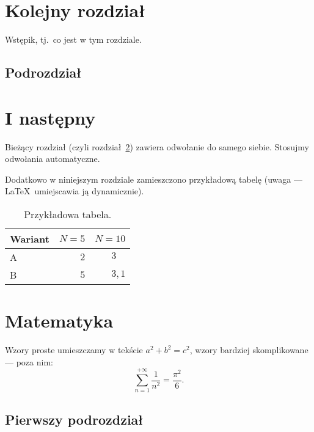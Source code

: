\documentclass[12pt,a4paper,twoside,openany]{book}
\begin{document}
\chapter{Kolejny rozdział}

Wstępik, tj.~co jest w tym rozdziale.

\section{Podrozdział}



\chapter{I następny}
\label{sec:nast}

Bieżący rozdział (czyli rozdział~\ref{sec:nast}) zawiera odwołanie do samego siebie. Stosujmy odwołania automatyczne.

Dodatkowo w niniejszym rozdziale zamieszczono przykładową tabelę (uwaga --- \LaTeX\ umiejscawia ją dynamicznie).



\begin{table}[h]
\centering
\caption{Przykładowa tabela.}
\label{tab:przyklad}
\footnotesize
\begin{tabular}{|l|r|r|}
\hline
Wariant & $N=5$ & $N=10$\\
\hline
A & $2$ & $3\phantom{{,}1}$ \\
B & $5$ & $3{,}1$ \\

\hline
\end{tabular} 
\end{table}

\clearpage

\chapter{Matematyka}

Wzory proste umieszczamy w tekście $a^2+b^2=c^2$, wzory bardziej skomplikowane --- poza nim:
\begin{equation}
\sum_{n=1}^{+\infty}\frac{1}{n^2}=\frac{\pi^2}{6}.
\end{equation}

\section{Pierwszy podrozdział}
\end{document}
